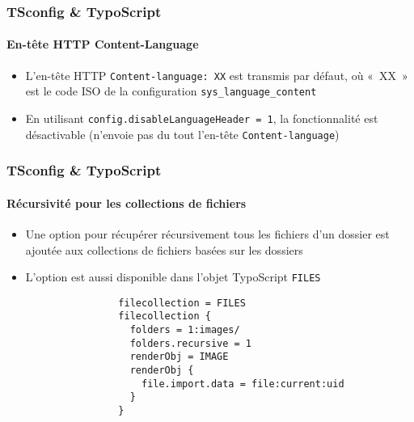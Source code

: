\begin{frame}[fragile]
	\frametitle{TSconfig \& TypoScript}
	\framesubtitle{En-tête HTTP Content-Language}

	\begin{itemize}

		\item L'en-tête HTTP \texttt{Content-language: XX} est transmis par défaut, où «~XX~» est le code ISO
			de la configuration \texttt{sys\_language\_content}

		\item En utilisant \texttt{config.disableLanguageHeader = 1}, la fonctionnalité est désactivable
			(n'envoie pas du tout l'en-tête \texttt{Content-language})

	\end{itemize}

\end{frame}


\begin{frame}[fragile]
	\frametitle{TSconfig \& TypoScript}
	\framesubtitle{Récursivité pour les collections de fichiers}

	\begin{itemize}

		\item Une option pour récupérer récursivement tous les fichiers d'un dossier est
			ajoutée aux collections de fichiers basées sur les dossiers

		\item L'option est aussi disponible dans l'objet TypoScript \texttt{FILES}

			\begin{lstlisting}
				filecollection = FILES
				filecollection {
				  folders = 1:images/
				  folders.recursive = 1
				  renderObj = IMAGE
				  renderObj {
				    file.import.data = file:current:uid
				  }
				}
			\end{lstlisting}

	\end{itemize}

\end{frame}

